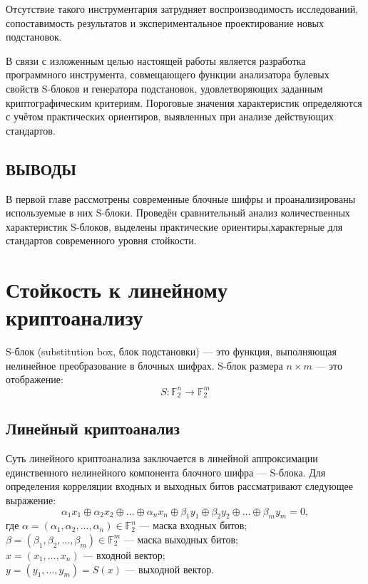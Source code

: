 Отсутствие такого инструментария затрудняет воспроизводимость
исследований, сопоставимость результатов и экспериментальное
проектирование новых подстановок.

В связи с изложенным целью настоящей работы является разработка
программного инструмента, совмещающего функции анализатора булевых
свойств S-блоков и генератора подстановок, удовлетворяющих заданным
криптографическим критериям. Пороговые значения характеристик
определяются с учётом практических ориентиров, выявленных при анализе
действующих стандартов.
\subsection*{ВЫВОДЫ}
В первой главе рассмотрены современные блочные шифры и проанализированы
используемые в них S-блоки. Проведён сравнительный анализ количественных характеристик S-блоков,
выделены практические ориентиры,характерные для стандартов современного уровня стойкости.


\newpage
\section{Стойкость к линейному криптоанализу}
\begin{definition}
S-блок (substitution box, блок подстановки) — это функция, выполняющая нелинейное преобразование в блочных шифрах.
S-блок размера $n\times m$ — это отображение:
\[S : \mathbb{F}_2^n \to \mathbb{F}_2^m\]
\end{definition}
\subsection{Линейный криптоанализ}

Суть линейного криптоанализа заключается в линейной аппроксимации единственного нелинейного компонента блочного шифра — S-блока. Для определения корреляции входных и выходных битов рассматривают следующее выражение:
\[
    \alpha_1x_1 \oplus \alpha_2x_2 \oplus \dots \oplus \alpha_nx_n \oplus \beta_1y_1 \oplus \beta_2y_2 \oplus \dots \oplus \beta_my_m = 0,
\]
где $\alpha = (\alpha_1, \alpha_2, \dots, \alpha_n) \in \mathbb{F}_2^n$ — маска входных битов; \\
\indent$\beta = (\beta_1, \beta_2, \dots, \beta_m) \in \mathbb{F}_2^m$ — маска выходных битов; \\
\indent$x = (x_1, \dots, x_n)$ — входной вектор; \\
\indent$y = (y_1, \dots, y_m) = S(x)$ — выходной вектор.

